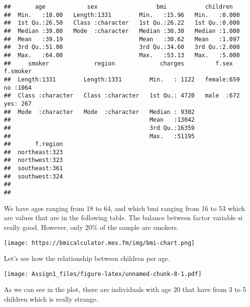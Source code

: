 \documentclass[
]{article}
\newenvironment{Shaded}{\begin{snugshade}}{\end{snugshade}}
\newcommand{\DecValTok}[1]{\textcolor[rgb]{0.00,0.00,0.81}{#1}}
\newcommand{\FunctionTok}[1]{\textcolor[rgb]{0.00,0.00,0.00}{#1}}
\newcommand{\NormalTok}[1]{#1}
\newcommand{\OtherTok}[1]{\textcolor[rgb]{0.56,0.35,0.01}{#1}}
\newcommand{\SpecialCharTok}[1]{\textcolor[rgb]{0.00,0.00,0.00}{#1}}
\begin{document}
\begin{verbatim}
##       age            sex                 bmi           children    
##  Min.   :18.00   Length:1331        Min.   :15.96   Min.   :0.000  
##  1st Qu.:26.50   Class :character   1st Qu.:26.22   1st Qu.:0.000  
##  Median :39.00   Mode  :character   Median :30.30   Median :1.000  
##  Mean   :39.19                      Mean   :30.62   Mean   :1.097  
##  3rd Qu.:51.00                      3rd Qu.:34.60   3rd Qu.:2.000  
##  Max.   :64.00                      Max.   :53.13   Max.   :5.000  
##     smoker             region             charges         f.sex     f.smoker  
##  Length:1331        Length:1331        Min.   : 1122   female:659   no :1064  
##  Class :character   Class :character   1st Qu.: 4720   male  :672   yes: 267  
##  Mode  :character   Mode  :character   Median : 9302                          
##                                        Mean   :13042                          
##                                        3rd Qu.:16359                          
##                                        Max.   :51195                          
##       f.region  
##  northeast:323  
##  northwest:323  
##  southeast:361  
##  southwest:324  
##                 
## 
\end{verbatim}

We have ages ranging from 18 to 64, and which bmi ranging from 16 to 53
which are values that are in the following table. The balance between
factor variable si really good. However, only 20\% of the sample are
smokers.

\texttt{[image: https://bmicalculator.mes.fm/img/bmi-chart.png]}

Let's see how the relationship between children per age.

\begin{Shaded}
\end{Shaded}

\texttt{[image: Assign1\_files/figure-latex/unnamed-chunk-8-1.pdf]}

As we can see in the plot, there are individuals with age 20 that have
from 3 to 5 children which is really strange.

\begin{Shaded}
\end{Shaded}
\end{document}
